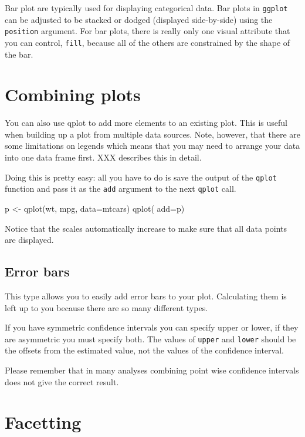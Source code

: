 Bar plot are typically used for displaying categorical data.  Bar plots in {\tt ggplot} can be adjusted to be stacked or dodged (displayed side-by-side) using the {\tt position} argument.  For bar plots, there is really only one visual attribute that you can control, {\tt fill}, because all of the others are constrained by the shape of the bar.	


\section{Combining plots}\label{sec:combining_plots}

You can also use qplot to add more elements to an existing plot.  This is useful when building up a plot from multiple data sources.  Note, however, that there are some limitations on legends which means that you may need to arrange your data into one data frame first.  XXX describes this in detail.

Doing this is pretty easy: all you have to do is save the output of the {\tt qplot} function and pass it as the {\tt add} argument to the next {\tt qplot} call.

p <- qplot(wt, mpg, data=mtcars)
qplot(  add=p)

Notice that the scales automatically increase to make sure that all data points are displayed.

\subsection{Error bars}\label{sub:error_bars}

This type allows you to easily add error bars to your plot.  Calculating them is left up to you because there are so many different types. 

If you have symmetric confidence intervals you can specify upper or lower, if they are asymmetric you must specify both.  The values of {\tt upper} and {\tt lower} should be the offsets from the estimated value, not the values of the confidence interval.

Please remember that in many analyses combining point wise confidence intervals does not give the correct result.

\section{Facetting}\label{sec:facetting}

